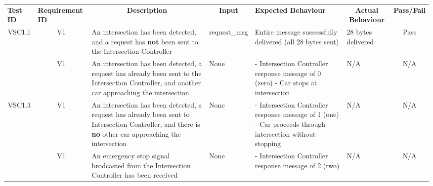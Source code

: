 \documentclass [10pt]{article}
\begin{document}
    
 \begin{longtable}{ | p{ } | p{ } |  p{ } |  p{ } | p{ } | p{ } |  p{ } |}  \hline

    \rowcolor{subsectionC}\textbf{Test ID}  
    & \textbf{Requirement ID}
    & \multicolumn{1}{c|}{\textbf{Description} }
    & \multicolumn{1}{c|}{\textbf{Input} }
    & \textbf{Expected Behaviour} 
    & \multicolumn{1}{c|}{\textbf{Actual Behaviour} }
    & \textbf{Pass/Fail} \\  
    
    
    
    
    \multicolumn{1}{|c|}{VSC1.1} 
    & \multicolumn{1}{c|}{V1}
    & An intersection has been detected, and a request has \textbf{not} been sent to the Intersection Controller \newline
    & request\_msg
    & Entire message successfully delivered (all 28 bytes sent)
    & 28 bytes delivered
    & \multicolumn{1}{c|}{Pass}\\  
     
    \rowcolor{tableCell}\multicolumn{1}{|c|}{VSC1.2} 
    & \multicolumn{1}{c|}{V1}
     & An intersection has been detected, a request has already been sent to the Intersection Controller, and another car approaching the intersection
    & None
    & - Intersection Controller response message of 0 (zero) \newline
      - Car stops at intersection
    & N/A
    & \multicolumn{1}{c|}{N/A}\\  
  
    
    \multicolumn{1}{|c|}{VSC1.3} 
    & \multicolumn{1}{c|}{V1}
    & An intersection has been detected, a request has already been sent to Intersection Controller, and there is \textbf{no} other car approaching the intersection
    & None
    & - Intersection Controller response message of 1 (one) \newline
      - Car proceeds through intersection without stopping
    & N/A
    & \multicolumn{1}{c|}{N/A}\\  \hline
    
    \newpage \hline
    
    \rowcolor{tableCell}\multicolumn{1}{|c|}{VSC1.4} 
    & \multicolumn{1}{c|}{V1}
    & An emergency stop signal brodcasted from the Intersection Controller has been received
    & None
    & - Intersection Controller response message of 2 (two)
    & N/A
    & \multicolumn{1}{c|}{N/A}\\  \hline
     
    \end{longtable}
\end{document}

